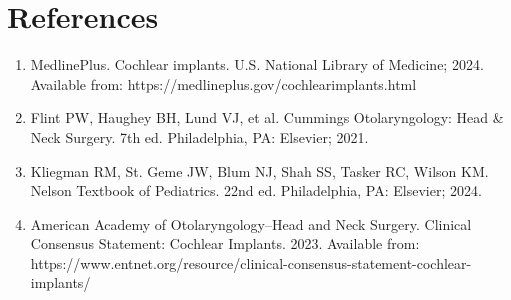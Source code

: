 \section*{References}
\begin{enumerate}
  \item MedlinePlus. Cochlear implants. U.S. National Library of Medicine; 2024. Available from: https://medlineplus.gov/cochlearimplants.html
  \item Flint PW, Haughey BH, Lund VJ, et al. Cummings Otolaryngology: Head \& Neck Surgery. 7th ed. Philadelphia, PA: Elsevier; 2021.
  \item Kliegman RM, St. Geme JW, Blum NJ, Shah SS, Tasker RC, Wilson KM. Nelson Textbook of Pediatrics. 22nd ed. Philadelphia, PA: Elsevier; 2024.
  \item American Academy of Otolaryngology--Head and Neck Surgery. Clinical Consensus Statement: Cochlear Implants. 2023. Available from: https://www.entnet.org/resource/clinical-consensus-statement-cochlear-implants/
\end{enumerate}

\clearpage

